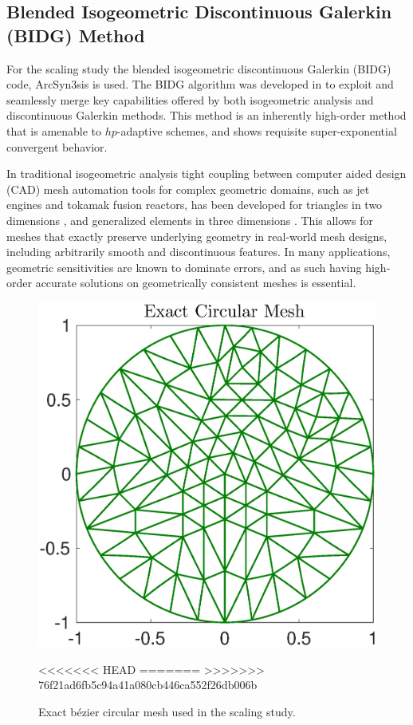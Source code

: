 \subsection{Blended Isogeometric Discontinuous Galerkin (BIDG) Method}
\label{sec:isogeometric}

For the scaling study the blended isogeometric discontinuous Galerkin (BIDG) code, ArcSyn3sis is used.  The BIDG algorithm was developed in \cite{Michoski2016658} to exploit and seamlessly merge key capabilities offered by both isogeometric analysis and discontinuous Galerkin methods. This method is an inherently high-order method that is amenable to $hp$-adaptive schemes, and shows requisite super-exponential convergent behavior.

In traditional isogeometric analysis tight coupling between computer aided design (CAD) mesh automation tools for complex geometric domains, such as jet engines and tokamak fusion reactors, has been developed for triangles in two dimensions \cite{Engvall2016378}, and generalized elements in three dimensions \cite{EngvallPress}.  This allows for meshes that exactly preserve underlying geometry in real-world mesh designs, including arbitrarily smooth and discontinuous features.  In many applications, geometric sensitivities are known to dominate errors, and as such having high-order accurate solutions on geometrically consistent meshes is essential.


\begin{figure}[h]
\begin{center}
\includegraphics[width=0.8\linewidth]{./bidg_data/168_circ}
\end{center}
\vspace*{-.5cm}
\caption{Exact b\'{e}zier circular mesh used in the scaling study.}
<<<<<<< HEAD
\label{fig:iso_circ}
=======
\label{fig:168_circ}
>>>>>>> 76f21ad6fb5c94a41a080cb446ca552f26db006b
\end{figure}


